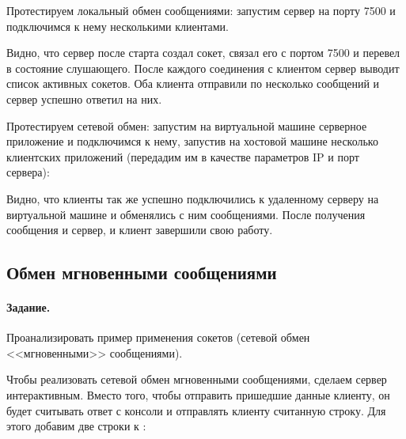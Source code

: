 

Протестируем локальный обмен сообщениями: запустим сервер на порту 7500 и подключимся к нему несколькими клиентами.







Видно, что сервер после старта создал сокет, связал его с портом 7500 и перевел в состояние слушающего. После каждого соединения с клиентом сервер выводит список активных сокетов. Оба клиента отправили по несколько сообщений и сервер успешно ответил на них.

Протестируем сетевой обмен: запустим на виртуальной машине серверное приложение и подключимся к нему, запустив на хостовой машине несколько клиентских приложений (передадим им в качестве параметров IP и порт сервера):







Видно, что клиенты так же успешно подключились к удаленному серверу на виртуальной машине и обменялись с ним сообщениями. После получения сообщения  и сервер, и клиент завершили свою работу.

\subsection{Обмен мгновенными сообщениями}

\paragraph{Задание.} Проанализировать пример применения сокетов (сетевой обмен <<мгновенными>> сообщениями).

Чтобы реализовать сетевой обмен мгновенными сообщениями, сделаем сервер интерактивным. Вместо того, чтобы отправить пришедшие данные клиенту, он будет считывать ответ с консоли и отправлять клиенту считанную строку. Для этого добавим две строки к :

